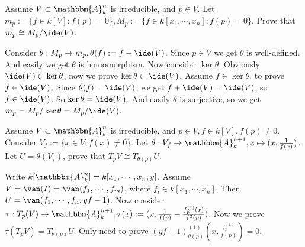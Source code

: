 \documentclass{ctexart}
\newif\ifpreface
\begin{document}
\large
\setlength{\baselineskip}{1.2em}
\ifpreface
    
\newgeometry{left=2cm,right=2cm,top=2cm,bottom=2cm}
\else
{}
\maketitle
\fi
\begin{problem}
  Assume \(V \subset \mathbbm{A}_k^{n}\) is irreducible, and \(p \in V\). 
  Let \(m_p := \{f \in k[V] : f(p) = 0\}, M_p := \{f \in k[x_1,\cdots,x_n]: f(p) = 0\}\). 
  Prove that \(m_p \cong M_p/\ide(V)\). 
\end{problem}

\begin{solution}
  Consider \( \theta : M_p \to m_p ,\theta(f) := f + \ide(V)\).
  Since \( p \in V\) we get \(\theta\) is well-defined. 
  And easily we get \(\theta\) is homomorphism. Now consider \(\ker \theta\). 
  Obviously \(\ide(V) \subset \ker \theta\), now we prove \(\ker \theta \subset \ide(V)\). 
  Assume \( f \in \ker\theta\), to prove \(f \in \ide(V)\). 
  Since \(\theta(f)=\ide(V)\), we get \(f+\ide(V)=\ide(V)\), so \(f \in \ide(V)\). 
  So \(\ker \theta = \ide(V)\). And easily \(\theta\) is surjective, so we get 
  \(m_p=M_p/\ker \theta=M_p/\ide(V)\). 
\end{solution}

\begin{problem}
  Assume \(V \subset \mathbbm{A}_k^n\) is irreducible, and \(p \in V,f \in k[V], f(p)\neq 0\). 
  Consider \(V_f:= \{x \in V: f(x)\neq 0 \}\). Let \(\theta: V_f \to \mathbbm{A}_k^{n+1},x \mapsto (x,\frac{1}{f(x)})\). 
  Let \(U = \theta(V_f)\), prove that \(T_p V \cong T_{\theta(p)} U\). 
\end{problem}

\begin{solution}
  Write \(k[\mathbbm{A}_k^n]=k[x_1,\cdots , x_n ,y]\). Assume \(V = \van(I)= \van(f_1,\cdots, f_m)\), where \(f_i \in k[x_1,\cdots,x_n ]\). 
  Then \(U = \van(f_1,\cdots,f_n, yf-1)\). Now consider \(\tau: T_p(V) \to \mathbbm{A}_k^{n+1}, \tau(x):=(x,\frac{1}{f(p)}-\frac{f_p^{(1)}(x)}{f^2(p)})\). 
  Now we prove \(\tau(T_p V)=T_{\theta(p)} U\). 
  Only need to prove \((yf-1)_{\theta(p)}^{(1)}(x,\frac{f_p^{(1)}}{f(p)})=0\). 
  
\end{solution}
\end{document}
